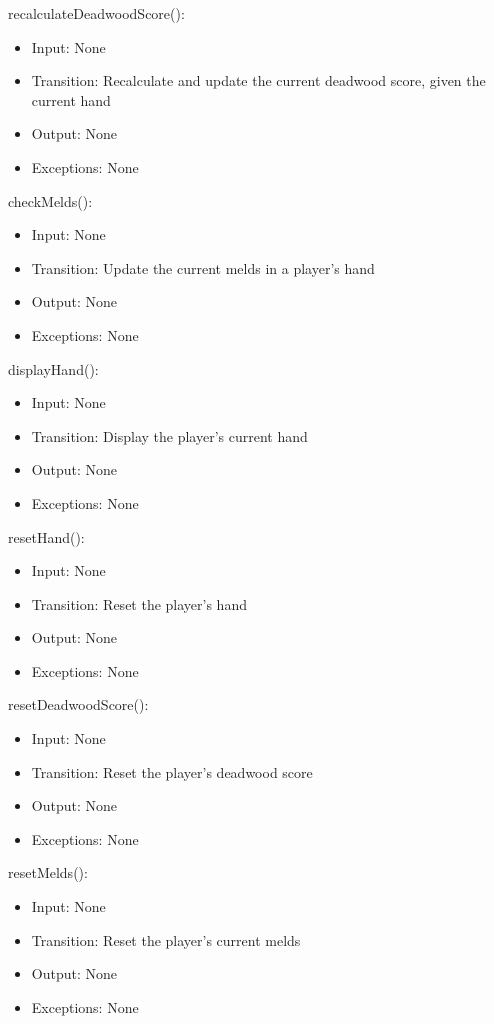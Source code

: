 \documentclass[12pt, titlepage]{article}
\begin{document}
\noindent recalculateDeadwoodScore():
\begin{itemize}
    \item Input: None
    \item Transition: Recalculate and update the current deadwood score, given the current hand
    \item Output: None
    \item Exceptions: None
\end{itemize}

\noindent checkMelds():
\begin{itemize}
    \item Input: None
    \item Transition: Update the current melds in a player's hand
    \item Output: None
    \item Exceptions: None
\end{itemize}

\noindent displayHand():
\begin{itemize}
    \item Input: None
    \item Transition: Display the player's current hand
    \item Output: None
    \item Exceptions: None
\end{itemize}

\noindent resetHand():
\begin{itemize}
    \item Input: None
    \item Transition: Reset the player's hand
    \item Output: None
    \item Exceptions: None
\end{itemize}

\noindent resetDeadwoodScore():
\begin{itemize}
    \item Input: None
    \item Transition: Reset the player's deadwood score
    \item Output: None
    \item Exceptions: None
\end{itemize}

\noindent resetMelds():
\begin{itemize}
    \item Input: None
    \item Transition: Reset the player's current melds
    \item Output: None
    \item Exceptions: None
\end{itemize}
\end{document}
